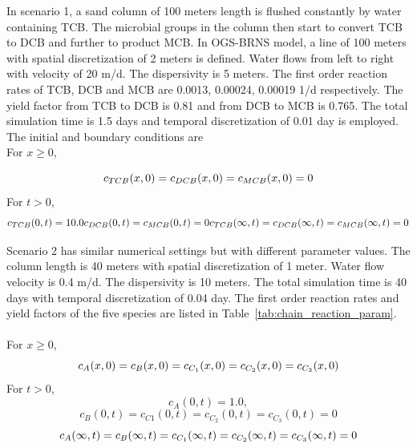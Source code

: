 In scenario 1, a sand column of 100 meters length is flushed constantly by water containing TCB. The microbial groups in the column then start to convert TCB to DCB and further to product MCB. In OGS-BRNS model, a line of 100 meters with spatial discretization of 2 meters is defined. Water flows from left to right with velocity of 20 m/d. The dispersivity is 5 meters. The first order reaction rates of TCB, DCB and MCB are 0.0013, 0.00024, 0.00019 1/d respectively. The yield factor from TCB to DCB is 0.81 and from DCB to MCB is 0.765. The total simulation time is 1.5 days and temporal discretization of 0.01 day is employed. The initial and boundary conditions are
~~\\
For $x \geq 0$,

\begin{equation}
c_{TCB}(x,0) = c_{DCB}(x,0) = c_{MCB}(x,0) = 0  \\
\end{equation}
For $t > 0$, 
\begin{equation}
c_{TCB}(0,t)=10.0 \\
c_{DCB}(0,t)=c_{MCB}(0,t)=0   \\
c_{TCB}(\infty,t)=c_{DCB}(\infty,t)=c_{MCB}(\infty,t)=0   \\
\end{equation}

Scenario 2 has similar numerical settings but with different parameter values. The column length is 40 meters with spatial discretization of 1 meter. Water flow velocity is 0.4 m/d. The dispersivity is 10 meters. The total simulation time is 40 days with temporal discretization of 0.04 day. The first order reaction rates and yield factors of the five species are listed in Table~\ref{tab:chain_reaction_param}. 
~~\\
For $x \geq 0$, 
\begin{equation}
c_{A}(x,0)=c_{B}(x,0) = c_{C_1}(x,0) = c_{C_2}(x,0) = c_{C_3}(x,0)   \\
\end{equation}
For $t > 0$, 
\begin{equation}
c_{A}(0,t) =1.0, 
\end{equation}
\begin{equation}
c_{B}(0,t) = c_{C1}(0,t) = c_{C_2}(0,t) = c_{C_3}(0,t)=0  
\end{equation}
\begin{equation}
c_{A}(\infty,t) = c_{B}(\infty,t)=c_{C_1}(\infty,t)= c_{C_2}(\infty,t)= c_{C_3}(\infty,t)=0   \\
\end{equation}

